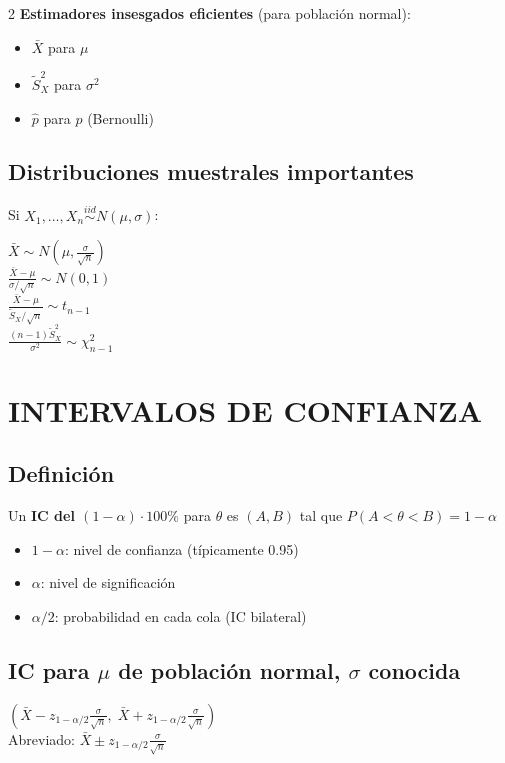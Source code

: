 \documentclass[9pt,a4paper]{article}
\begin{document}
\begin{multicols}{2}
\textbf{Estimadores insesgados eficientes} (para población normal):
\begin{itemize}[leftmargin=*]
\item $\bar{X}$ para $\mu$
\item $\tilde{S}^2_X$ para $\sigma^2$
\item $\hat{p}$ para $p$ (Bernoulli)
\end{itemize}

\subsection{Distribuciones muestrales importantes}
Si $X_1,\ldots,X_n\stackrel{iid}{\sim}N(\mu,\sigma)$:
\begin{formulabox}
$\bar{X}\sim N\left(\mu,\frac{\sigma}{\sqrt{n}}\right)$\\[3pt]
$\frac{\bar{X}-\mu}{\sigma/\sqrt{n}}\sim N(0,1)$\\[3pt]
$\frac{\bar{X}-\mu}{\tilde{S}_X/\sqrt{n}}\sim t_{n-1}$\\[3pt]
$\frac{(n-1)\tilde{S}^2_X}{\sigma^2}\sim\chi^2_{n-1}$
\end{formulabox}

\section{INTERVALOS DE CONFIANZA}

\subsection{Definición}
Un \textbf{IC del $(1-\alpha)\cdot 100\%$} para $\theta$ es $(A,B)$ tal que $P(A<\theta<B)=1-\alpha$
\begin{itemize}[leftmargin=*]
\item $1-\alpha$: nivel de confianza (típicamente 0.95)
\item $\alpha$: nivel de significación
\item $\alpha/2$: probabilidad en cada cola (IC bilateral)
\end{itemize}

\subsection{IC para $\mu$ de población normal, $\sigma$ conocida}
\begin{formulabox}
$\left(\bar{X}-z_{1-\alpha/2}\frac{\sigma}{\sqrt{n}},\; \bar{X}+z_{1-\alpha/2}\frac{\sigma}{\sqrt{n}}\right)$\\[3pt]
Abreviado: $\bar{X}\pm z_{1-\alpha/2}\frac{\sigma}{\sqrt{n}}$
\end{formulabox}


\end{multicols}
\end{document}
